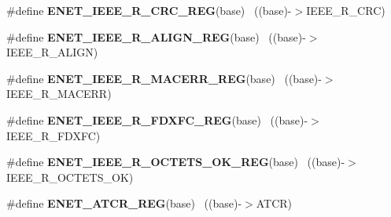 \begin{DoxyCompactItemize}
\item 
\hypertarget{group___e_n_e_t___register___accessor___macros_gabdbfb8a0657e5d2fb34cc8b2ef7d05f3}{}\#define {\bfseries E\+N\+E\+T\+\_\+\+I\+E\+E\+E\+\_\+\+R\+\_\+\+C\+R\+C\+\_\+\+R\+E\+G}(base)                            ~((base)-\/$>$I\+E\+E\+E\+\_\+\+R\+\_\+\+C\+R\+C)\label{group___e_n_e_t___register___accessor___macros_gabdbfb8a0657e5d2fb34cc8b2ef7d05f3}

\item 
\hypertarget{group___e_n_e_t___register___accessor___macros_gac969b4abaab4fe053704e44c8fb7ef54}{}\#define {\bfseries E\+N\+E\+T\+\_\+\+I\+E\+E\+E\+\_\+\+R\+\_\+\+A\+L\+I\+G\+N\+\_\+\+R\+E\+G}(base)                        ~((base)-\/$>$I\+E\+E\+E\+\_\+\+R\+\_\+\+A\+L\+I\+G\+N)\label{group___e_n_e_t___register___accessor___macros_gac969b4abaab4fe053704e44c8fb7ef54}

\item 
\hypertarget{group___e_n_e_t___register___accessor___macros_ga56520f7e6d817cd7cec8343b9dff2ef6}{}\#define {\bfseries E\+N\+E\+T\+\_\+\+I\+E\+E\+E\+\_\+\+R\+\_\+\+M\+A\+C\+E\+R\+R\+\_\+\+R\+E\+G}(base)                      ~((base)-\/$>$I\+E\+E\+E\+\_\+\+R\+\_\+\+M\+A\+C\+E\+R\+R)\label{group___e_n_e_t___register___accessor___macros_ga56520f7e6d817cd7cec8343b9dff2ef6}

\item 
\hypertarget{group___e_n_e_t___register___accessor___macros_ga1126a8cd6e25e49c71b983705beaedd3}{}\#define {\bfseries E\+N\+E\+T\+\_\+\+I\+E\+E\+E\+\_\+\+R\+\_\+\+F\+D\+X\+F\+C\+\_\+\+R\+E\+G}(base)                        ~((base)-\/$>$I\+E\+E\+E\+\_\+\+R\+\_\+\+F\+D\+X\+F\+C)\label{group___e_n_e_t___register___accessor___macros_ga1126a8cd6e25e49c71b983705beaedd3}

\item 
\hypertarget{group___e_n_e_t___register___accessor___macros_ga84049cb505bb17857312888df8ee15bd}{}\#define {\bfseries E\+N\+E\+T\+\_\+\+I\+E\+E\+E\+\_\+\+R\+\_\+\+O\+C\+T\+E\+T\+S\+\_\+\+O\+K\+\_\+\+R\+E\+G}(base)                ~((base)-\/$>$I\+E\+E\+E\+\_\+\+R\+\_\+\+O\+C\+T\+E\+T\+S\+\_\+\+O\+K)\label{group___e_n_e_t___register___accessor___macros_ga84049cb505bb17857312888df8ee15bd}

\item 
\hypertarget{group___e_n_e_t___register___accessor___macros_ga28daca4096ddaaee586238e193d15da6}{}\#define {\bfseries E\+N\+E\+T\+\_\+\+A\+T\+C\+R\+\_\+\+R\+E\+G}(base)                                        ~((base)-\/$>$A\+T\+C\+R)\label{group___e_n_e_t___register___accessor___macros_ga28daca4096ddaaee586238e193d15da6}


\end{DoxyCompactItemize}
